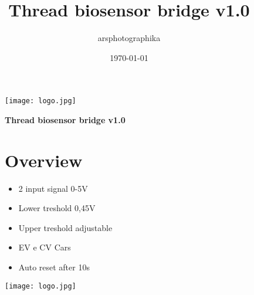 \documentclass[a4paper,12pt,oneside,pdflatex,italian,final]{article}
\title{Thread biosensor bridge v1.0}
\author{arsphotographika }
\date{\today}
\begin{document}
\pagestyle{fancy}

\chead {\today}

\begin{figure}
\begin{minipage}{0.47\textwidth}
\centering
\texttt{[image: logo.jpg]}

\end{minipage}
\hfill
\begin{minipage}{0.47\textwidth}
\raggedleft
\Huge \textbf{Thread biosensor bridge v1.0}
\end{minipage}
\end{figure}


\begin{figure}
\begin{minipage}{0.47\textwidth}

\section{Overview}
    \begin{itemize}
        \item 2 input signal 0-5V
        \item Lower treshold 0,45V
        \item Upper treshold adjustable
        \item EV e CV Cars
        \item Auto reset after 10s
    \end{itemize}


\end{minipage}
\hfill
\begin{minipage}{0.47\textwidth}
\centering
\texttt{[image: logo.jpg]}

\end{minipage}
\end{figure}
\end{document}
